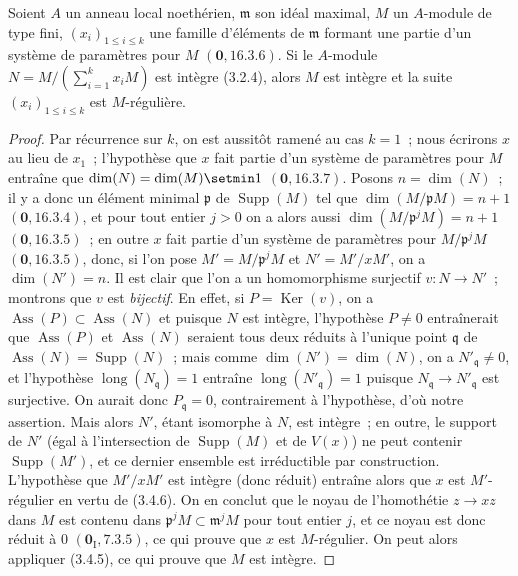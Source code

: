 \begin{corollary}[3.4.7]
\label{IV.2.3.4.7-fr}
Soient $A$ un anneau local noethérien, $\mathfrak m$ son idéal maximal, $M$ un
$A$-module de type fini, $(x_i)_{1\leqslant i\leqslant k}$ une famille
d'éléments de $\mathfrak m$ formant une partie d'un système de
paramètres pour $M$ $(\mathbf{0},16.3.6)$. Si le $A$-module
$N=M/(\sum_{i=1}^k x_iM)$
est intègre \textup{(3.2.4)}, alors $M$ est intègre et la suite
$(x_i)_{1\leqslant i\leqslant k}$ est $M$-régulière.
\end{corollary}

\begin{proof}
Par récurrence sur $k$, on est aussitôt ramené au cas $k=1$~; nous écrirons
$x$ au lieu de $x_1$~; l'hypothèse que $x$ fait partie d'un système de
paramètres pour $M$ entraîne que
$\dim(N)=\dim(M)\setmin 1$ $(\mathbf{0},16.3.7)$. Posons $n=\dim(N)$~; il y a donc un élément
minimal $\mathfrak p$ de $\operatorname{Supp}(M)$ tel que
$\dim(M/\mathfrak pM)=n+1$ $(\mathbf{0},16.3.4)$, et pour tout entier $j>0$ on a alors
aussi $\dim(M/\mathfrak p^jM)=n+1$ $(\mathbf{0},16.3.5)$~; en outre $x$ fait partie
d'un système de paramètres pour $M/\mathfrak p^jM$ $(\mathbf{0},16.3.5)$, donc, si
l'on pose $M'=M/\mathfrak p^jM$ et $N'=M'/xM'$, on a $\dim(N')=n$. Il est
clair que l'on a un homomorphisme surjectif $v:N\to N'$~; montrons que $v$ est
\emph{bijectif}. En effet, si $P=\operatorname{Ker}(v)$, on a
$\operatorname{Ass}(P)\subset\operatorname{Ass}(N)$ et puisque $N$ est
intègre, l'hypothèse $P\neq0$ entraînerait que $\operatorname{Ass}(P)$ et
$\operatorname{Ass}(N)$ seraient tous deux réduits à l'unique point
$\mathfrak q$ de
$\operatorname{Ass}(N)=\operatorname{Supp}(N)$~; mais comme
$\dim(N')=\dim(N)$, on a $N'_{\mathfrak q}\neq0$, et l'hypothèse
$\operatorname{long}(N_{\mathfrak q})=1$ entraîne
$\operatorname{long}(N'_{\mathfrak q})=1$ puisque
$N_{\mathfrak q}\to N'_{\mathfrak q}$ est surjective. On aurait donc
$P_{\mathfrak q}=0$, contrairement à l'hypothèse, d'où notre assertion.
Mais alors $N'$, étant isomorphe à $N$, est intègre~; en outre, le support de
$N'$ (égal à l'intersection de $\operatorname{Supp}(M)$ et de $V(x)$) ne
peut contenir $\operatorname{Supp}(M')$, et ce dernier ensemble est
irréductible par construction. L'hypothèse que $M'/xM'$ est intègre (donc
réduit) entraîne alors que $x$ est $M'$-régulier en vertu de (3.4.6). On en
conclut que le noyau de l'homothétie $z\to xz$ dans $M$ est contenu dans
$\mathfrak p^jM\subset\mathfrak m^jM$ pour tout entier $j$, et ce noyau est
donc réduit à $0$ $(\mathbf{0}_{\mathrm I},7.3.5)$, ce qui prouve que $x$ est
$M$-régulier. On peut alors appliquer (3.4.5), ce qui prouve que $M$ est
intègre.
\end{proof}

